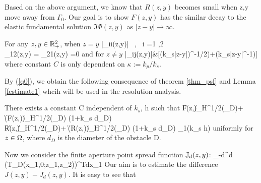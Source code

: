 \documentclass[12pt]{iopart}
\begin{document}
Based on the above argument, we know that $R(z,y)$ becomes small when z,y move away from $\Gamma_0$. Our goal is to show $F(z,y)$ has the similar decay to the elastic fundamental solution $\Im\Phi(z,y)$ as $|z-y|\to\infty$.
\begin{lem} \label{festimate1}
	For any $z,y\in \mathbb{R}_+^2$, when $z=y$
	\ben 
	|\Im \F_{ii}(z,y)| \geq {} \ , \ i =1 ,2 \\
	\Im \F_{12}(z,y) = \Im \F_{21}(z,y) =0
	\een
	and for $z\neq y$
	\ben
	|\F_{ij}(z,y)|&\le {}[(k_s|z-y|)^{-1/2})+(k_s|z-y|^{-1})]
	\een
	where constant $C$ is only dependent on $\kappa:=k_p/k_s$.
\end{lem}
By (\ref{q0}), we obtain the following consequence of theorem \ref{thm_psf} and Lemma \ref{festimate1} whcih will be used in the resolution analysis.
\begin{cor}\label{cor_psf}
	There exists a constant C independent of $k_s$, h such that
	\ben\hspace{-2cm}
	\|F(z,\cdot)\|_{H^{1/2}(\Gamma_D)}+	\|\sigma(F(z,\cdot))\cdot\nu\|_{H^{1/2}(\Gamma_D)}
	\leq  {}(1+k_s d_D) \\ \hspace{-2cm}
	\|R(z,\cdot)\|_{H^{1/2}(\Gamma_D)}+	\|\sigma(R(z,\cdot))\cdot\nu\|_{H^{1/2}(\Gamma_D)}
	\leq  {}(1+k_s d_D) \epsilon_1(k_s h)
	\een
	uniformly for $z\in\Omega$, where $d_D$ is the diameter of the obstacle D.	
\end{cor}

Now we consider the finite aperture point spread function $\mathbb{J}_d(z,y)$:
\be
\int_{-d}^{d} (T_D(x_1,0;z_1,z_2))^Tdx_1
\ee
Our aim is to estimate the difference $J(z,y)-J_d(z,y)$. It is easy to see that
\end{document}
